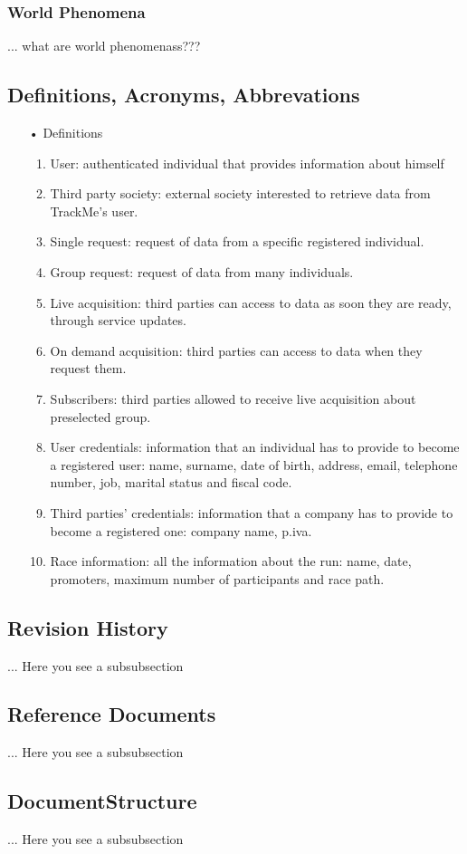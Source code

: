 \subsubsection{World Phenomena}
... what are world phenomenass???

\subsection{Definitions, Acronyms, Abbrevations}

\begin{enumerate}
\item[•] {\Large Definitions}
	\begin{enumerate}
		\item User: authenticated individual that provides information about himself
		\item Third party society: external society interested to retrieve data from 					TrackMe's user.
		\item Single request: request of data from a specific registered individual.
		\item Group request: request of data from many individuals. 
		\item Live acquisition: third parties can access to data as soon they are ready, 				through service updates.
		\item On demand acquisition: third parties can access to data when they request 				them.
		\item Subscribers: third parties allowed to receive live acquisition about 						preselected	group.
		\item User credentials: information that an individual has to provide to become a 				registered user: name, surname, date of birth, address, email, telephone
			number, job, marital status and fiscal code. 
		\item Third parties’ credentials: information that a company has to provide to 					become a registered one: company name, p.iva.
		\item Race information: all the information about the run: name, date, promoters, 				maximum number of participants and race path.
	\end{enumerate}
\end{enumerate}
	
\subsection{Revision History}
... Here you see a subsubsection
\subsection{Reference Documents}
... Here you see a subsubsection
\subsection{DocumentStructure}
... Here you see a subsubsection

